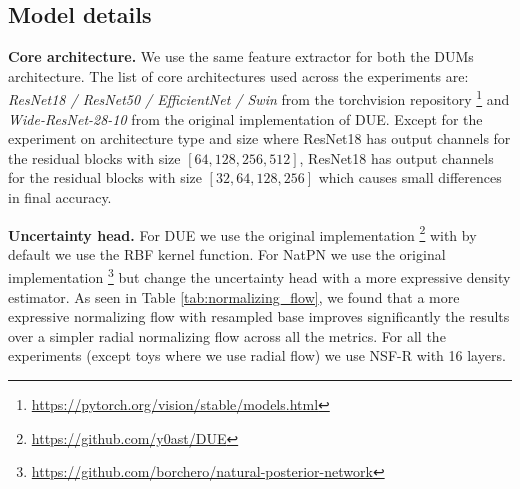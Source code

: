 \subsection{Model details} 

\textbf{Core architecture.} We use the same feature extractor for both the DUMs architecture. The list of core architectures used across the experiments are: \textit{ResNet18 / ResNet50 / EfficientNet / Swin} \citep{resnet, tan2021effcientnet, liu2021swin} from the torchvision repository \footnote{\url{https://pytorch.org/vision/stable/models.html}} and \textit{Wide-ResNet-28-10} \citep{zagoruyko2016wide} from the original implementation of DUE. Except for the experiment on architecture type and size where ResNet18 has output channels for the residual blocks with size $[64,128,256,512]$,  ResNet18 has output channels for the residual blocks with size $[32, 64, 128, 256]$ which causes small differences in final accuracy.

\textbf{Uncertainty head.} For DUE we use the original implementation \footnote{\url{https://github.com/y0ast/DUE}} with by default we use the RBF kernel function. For NatPN we use the original implementation \footnote{\url{https://github.com/borchero/natural-posterior-network}} but change the uncertainty head with a more expressive density estimator. As seen in Table \ref{tab:normalizing_flow}, we found that a more expressive normalizing flow with resampled base \citep{durkan2019nsf, stimper2022resampled-nf} improves significantly the results over a simpler radial normalizing flow \citep{radialflow} across all the metrics. For all the experiments (except toys where we use radial flow) we use NSF-R with 16 layers.

